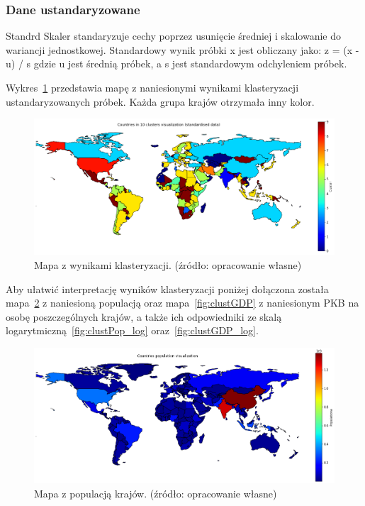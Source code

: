 \documentclass[11pt]{report}
\begin{document}
    \subsubsection{Dane ustandaryzowane}
    Standrd Skaler standaryzuje cechy poprzez usunięcie średniej i skalowanie do wariancji jednostkowej.
    Standardowy wynik próbki x jest obliczany jako:
    z = (x - u) / s
    gdzie u jest średnią próbek, a s jest standardowym odchyleniem próbek.

    Wykres~\ref{fig:clust10std} przedstawia mapę z naniesionymi wynikami klasteryzacji ustandaryzowanych próbek.
    Każda grupa krajów otrzymała inny kolor.

    \begin{figure}[ht!]
        \centering
        \includegraphics[width=1 \textwidth]{fig/CLUST/10clusterMap_std.png}
        \caption{Mapa z wynikami klasteryzacji. (źródło: opracowanie własne)}
        \label{fig:clust10std}
    \end{figure}

    Aby ułatwić interpretację wyników klasteryzacji poniżej dołączona została mapa~\ref{fig:clustPop} z naniesioną populacją oraz mapa~\ref{fig:clustGDP} z naniesionym PKB na osobę poszczególnych krajów, a także ich odpowiedniki ze skalą logarytmiczną~\ref{fig:clustPop_log} oraz~\ref{fig:clustGDP_log}.

    \begin{figure}[ht!]
        \centering
        \includegraphics[width=1 \textwidth]{fig/CLUST/population.png}
        \caption{Mapa z populacją krajów. (źródło: opracowanie własne)}
        \label{fig:clustPop}
    \end{figure}
\end{document}
